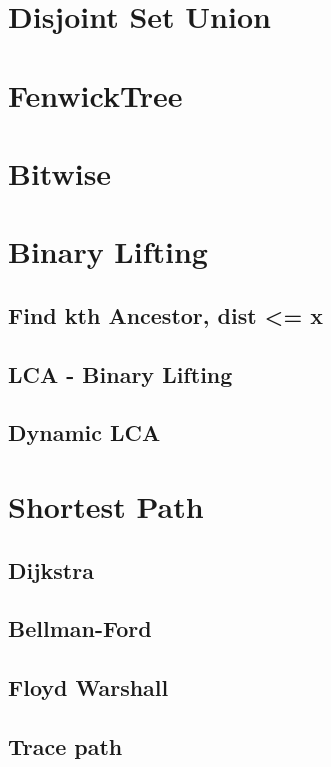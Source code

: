 \section{Disjoint Set Union}

\section{FenwickTree}

\section{Bitwise}

\section{Binary Lifting}
	\subsection{Find kth Ancestor, dist <= x}
	\subsection{LCA - Binary Lifting}
	\subsection{Dynamic LCA}

	
\section{Shortest Path}
	\subsection{Dijkstra}
	\subsection{Bellman-Ford}
	\subsection{Floyd Warshall}
	\subsection{Trace path}
